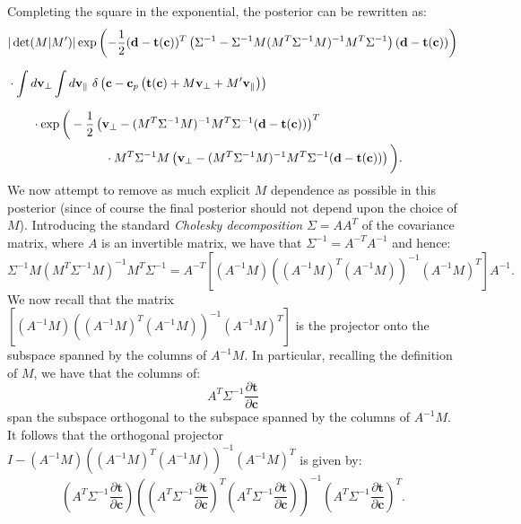 \documentclass[withindex,glossary]{cam-thesis}
\renewcommand{\vec}[1]{\textbf{#1}} %
\begin{document}
Completing the square in the exponential, the posterior can be rewritten as:
\begin{align}
& |\det(M|M')|\exp\left( -\frac{1}{2}(\vec{d} - \vec{t}(\vec{c}))^T \left( \Sigma^{-1} - \Sigma^{-1} M (M^T\Sigma^{-1}M)^{-1} M^T \Sigma^{-1}\right) (\vec{d} - \vec{t}(\vec{c})) \right) \notag\\[1.5ex]
& \cdot \int d\vec{v}_{\perp} \int d\vec{v}_{\parallel}\ \delta\left(\vec{c} - \vec{c}_p\left(\vec{t}(\vec{c}) + M\vec{v}_{\perp} + M'\vec{v}_{\parallel}\right) \right)\notag\\[1.5ex]
& \qquad\cdot \exp\bigg( -\frac{1}{2} \left(\vec{v}_{\perp} - (M^T \Sigma^{-1}M)^{-1} M^T \Sigma^{-1} (\vec{d} - \vec{t}(\vec{c}))\right)^T\notag \\
& \qquad\qquad\qquad\qquad \cdot M^T \Sigma^{-1}M \left(\vec{v}_{\perp} - (M^T \Sigma^{-1}M)^{-1} M^T \Sigma^{-1} (\vec{d} - \vec{t}(\vec{c}))\right) \bigg).
\end{align}
We now attempt to remove as much explicit $M$ dependence as possible in this posterior (since of course the final posterior should not depend upon the choice of $M$). Introducing the standard \textit{Cholesky decomposition} $\Sigma = AA^T$ of the covariance matrix, where $A$ is an invertible matrix, we have that $\Sigma^{-1} = A^{-T} A^{-1}$ and hence:
\begin{equation}
\Sigma^{-1} M (M^T \Sigma^{-1} M)^{-1} M^T \Sigma^{-1} = A^{-T} \left[ (A^{-1}M) ((A^{-1}M)^T(A^{-1}M))^{-1} (A^{-1}M)^T \right] A^{-1}.
\end{equation}
We now recall that the matrix $\left[ (A^{-1}M) ((A^{-1}M)^T(A^{-1}M))^{-1} (A^{-1}M)^T \right]$ is the projector onto the subspace spanned by the columns of $A^{-1}M$. In particular, recalling the definition of $M$, we have that the columns of:
\begin{equation}
A^T \Sigma^{-1} \frac{\partial \vec{t}}{\partial \vec{c}}
\end{equation}
span the subspace orthogonal to the subspace spanned by the columns of $A^{-1} M$. It follows that the orthogonal projector $I - (A^{-1}M) ((A^{-1}M)^T(A^{-1}M))^{-1} (A^{-1}M)^T$ is given by:
\begin{equation}
\left(A^T \Sigma^{-1} \frac{\partial \vec{t}}{\partial \vec{c}} \right) \left( \left(A^T \Sigma^{-1} \frac{\partial \vec{t}}{\partial \vec{c}}\right)^T \left( A^T \Sigma^{-1} \frac{\partial \vec{t}}{\partial \vec{c}} \right) \right)^{-1} \left( A^T \Sigma^{-1} \frac{\partial \vec{t}}{\partial \vec{c}} \right)^T.
\end{equation}
\end{document}
